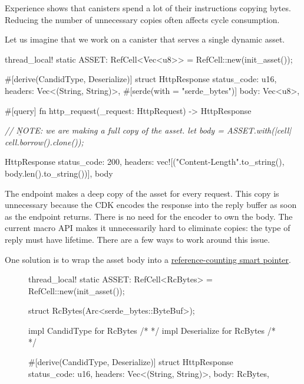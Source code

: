\documentclass{article}
\begin{document}

Experience shows that canisters spend a lot of their instructions copying bytes.
Reducing the number of unnecessary copies often affects cycle consumption.

Let us imagine that we work on a canister that serves a single dynamic asset.

\begin{code}[rust]
thread_local!{
    static ASSET: RefCell<Vec<u8>> = RefCell::new(init_asset());
}

#[derive(CandidType, Deserialize)]
struct HttpResponse {
    status_code: u16,
    headers: Vec<(String, String)>,
    #[serde(with = "serde_bytes")]
    body: Vec<u8>,
}

#[query]
fn http_request(_request: HttpRequest) -> HttpResponse {
    \em{// \b{NOTE}: we are making a full copy of the asset.}
    let body = ASSET.with(|cell| cell.borrow().clone());

    HttpResponse {
        status_code: 200,
        headers: vec![("Content-Length".to_string(), body.len().to_string())],
        body
    }
}
\end{code}

The  endpoint makes a deep copy of the asset for every request.
This copy is unnecessary because the CDK encodes the response into the reply buffer as soon as the endpoint returns.
There is no need for the encoder to own the body.
The current macro API makes it unnecessarily hard to eliminate copies: the type of reply must have  lifetime.
There are a few ways to work around this issue.

One solution is to wrap the asset body into a \href{https://doc.rust-lang.org/std/sync/struct.Arc.html}{reference-counting smart pointer}.

\begin{figure}
\begin{code}[rust]
thread_local!{
    static ASSET: RefCell<RcBytes> = RefCell::new(init_asset());
}

struct RcBytes(Arc<serde_bytes::ByteBuf>);

impl CandidType for RcBytes { /* */ }
impl Deserialize for RcBytes { /* */ }

#[derive(CandidType, Deserialize)]
struct HttpResponse {
    status_code: u16,
    headers: Vec<(String, String)>,
    body: RcBytes,
}
\end{code}
\end{figure}
\end{document}
